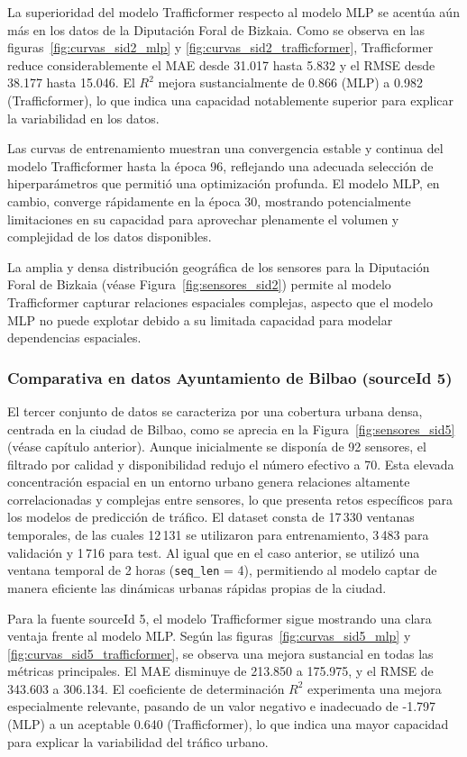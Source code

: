 La superioridad del modelo Trafficformer respecto al modelo MLP se acentúa aún más en los datos de la Diputación Foral de Bizkaia. Como se observa en las figuras~\ref{fig:curvas_sid2_mlp} y \ref{fig:curvas_sid2_trafficformer}, Trafficformer reduce considerablemente el MAE desde 31.017 hasta 5.832 y el RMSE desde 38.177 hasta 15.046. El $R^2$ mejora sustancialmente de 0.866 (MLP) a 0.982 (Trafficformer), lo que indica una capacidad notablemente superior para explicar la variabilidad en los datos.

Las curvas de entrenamiento muestran una convergencia estable y continua del modelo Trafficformer hasta la época 96, reflejando una adecuada selección de hiperparámetros que permitió una optimización profunda. El modelo MLP, en cambio, converge rápidamente en la época 30, mostrando potencialmente limitaciones en su capacidad para aprovechar plenamente el volumen y complejidad de los datos disponibles.

La amplia y densa distribución geográfica de los sensores para la Diputación Foral de Bizkaia (véase Figura~\ref{fig:sensores_sid2}) permite al modelo Trafficformer capturar relaciones espaciales complejas, aspecto que el modelo MLP no puede explotar debido a su limitada capacidad para modelar dependencias espaciales.

\subsubsection*{Comparativa en datos Ayuntamiento de Bilbao (sourceId 5)}

El tercer conjunto de datos se caracteriza por una cobertura urbana densa, centrada en la ciudad de Bilbao, como se aprecia en la Figura~\ref{fig:sensores_sid5} (véase capítulo anterior). Aunque inicialmente se disponía de 92 sensores, el filtrado por calidad y disponibilidad redujo el número efectivo a 70. Esta elevada concentración espacial en un entorno urbano genera relaciones altamente correlacionadas y complejas entre sensores, lo que presenta retos específicos para los modelos de predicción de tráfico. El dataset consta de 17\,330 ventanas temporales, de las cuales 12\,131 se utilizaron para entrenamiento, 3\,483 para validación y 1\,716 para test. Al igual que en el caso anterior, se utilizó una ventana temporal de 2 horas (\texttt{seq\_len} = 4), permitiendo al modelo captar de manera eficiente las dinámicas urbanas rápidas propias de la ciudad.

Para la fuente sourceId 5, el modelo Trafficformer sigue mostrando una clara ventaja frente al modelo MLP. Según las figuras~\ref{fig:curvas_sid5_mlp} y \ref{fig:curvas_sid5_trafficformer}, se observa una mejora sustancial en todas las métricas principales. El MAE disminuye de 213.850 a 175.975, y el RMSE de 343.603 a 306.134. El coeficiente de determinación $R^2$ experimenta una mejora especialmente relevante, pasando de un valor negativo e inadecuado de -1.797 (MLP) a un aceptable 0.640 (Trafficformer), lo que indica una mayor capacidad para explicar la variabilidad del tráfico urbano.

